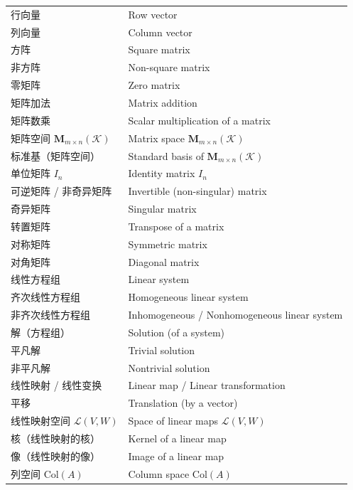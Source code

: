 \begin{center}
\begin{longtable}{|>{\raggedright\arraybackslash}p{5cm}|>{\raggedright\arraybackslash}p{8cm}|}
			行向量 & Row vector \\
			列向量 & Column vector \\
			方阵 & Square matrix \\
			非方阵 & Non-square matrix \\
			零矩阵 & Zero matrix \\
			矩阵加法 & Matrix addition \\
			矩阵数乘 & Scalar multiplication of a matrix \\
			矩阵空间 $\mathbf{M}_{m\times n}(\mathcal{K})$ & Matrix space $\mathbf{M}_{m\times n}(\mathcal{K})$ \\
			标准基（矩阵空间） & Standard basis of $\mathbf{M}_{m\times n}(\mathcal{K})$ \\
			单位矩阵 $I_n$ & Identity matrix $I_n$ \\
			可逆矩阵 / 非奇异矩阵 & Invertible (non-singular) matrix \\
			奇异矩阵 & Singular matrix \\
			转置矩阵 & Transpose of a matrix \\
			对称矩阵 & Symmetric matrix \\
			对角矩阵 & Diagonal matrix \\
			线性方程组 & Linear system \\
			齐次线性方程组 & Homogeneous linear system \\
			非齐次线性方程组 & Inhomogeneous / Nonhomogeneous linear system \\
			解（方程组） & Solution (of a system) \\
			平凡解 & Trivial solution \\
			非平凡解 & Nontrivial solution \\
			线性映射 / 线性变换 & Linear map / Linear transformation \\
			平移 & Translation (by a vector) \\
			线性映射空间 $\mathcal{L}(V,W)$ & Space of linear maps $\mathcal{L}(V,W)$ \\
			核（线性映射的核） & Kernel of a linear map \\
			像（线性映射的像） & Image of a linear map \\
			列空间 $\mathrm{Col}(A)$ & Column space $\mathrm{Col}(A)$ \\

\end{longtable}
\end{center}
